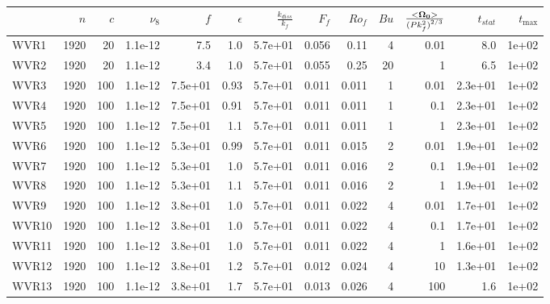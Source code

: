 \documentclass[a4paper]{article}
\begin{document}
\begin{tabular}{lrrrrrrrrrrrr}
\toprule
{} &   $n$ &  $c$ &  $\nu_8$ &     $f$ &  $\epsilon$ &  $\frac{k_{diss}}{k_f}$ &  $F_f$ &  $Ro_f$ &  $Bu$ &  $\frac{<\bf \Omega_0 >}{{(P k_f^2)}^{2/3}}$ &  $t_{stat}$ &  $t_{\max}$ \\
\midrule
WVR1  &  1920 &   20 &  1.1e-12 &     7.5 &         1.0 &                 5.7e+01 &  0.056 &    0.11 &     4 &                                         0.01 &         8.0 &       1e+02 \\
WVR2  &  1920 &   20 &  1.1e-12 &     3.4 &         1.0 &                 5.7e+01 &  0.055 &    0.25 &    20 &                                            1 &         6.5 &       1e+02 \\
WVR3  &  1920 &  100 &  1.1e-12 & 7.5e+01 &        0.93 &                 5.7e+01 &  0.011 &   0.011 &     1 &                                         0.01 &     2.3e+01 &       1e+02 \\
WVR4  &  1920 &  100 &  1.1e-12 & 7.5e+01 &        0.91 &                 5.7e+01 &  0.011 &   0.011 &     1 &                                          0.1 &     2.3e+01 &       1e+02 \\
WVR5  &  1920 &  100 &  1.1e-12 & 7.5e+01 &         1.1 &                 5.7e+01 &  0.011 &   0.011 &     1 &                                            1 &     2.3e+01 &       1e+02 \\
WVR6  &  1920 &  100 &  1.1e-12 & 5.3e+01 &        0.99 &                 5.7e+01 &  0.011 &   0.015 &     2 &                                         0.01 &     1.9e+01 &       1e+02 \\
WVR7  &  1920 &  100 &  1.1e-12 & 5.3e+01 &         1.0 &                 5.7e+01 &  0.011 &   0.016 &     2 &                                          0.1 &     1.9e+01 &       1e+02 \\
WVR8  &  1920 &  100 &  1.1e-12 & 5.3e+01 &         1.1 &                 5.7e+01 &  0.011 &   0.016 &     2 &                                            1 &     1.9e+01 &       1e+02 \\
WVR9  &  1920 &  100 &  1.1e-12 & 3.8e+01 &         1.0 &                 5.7e+01 &  0.011 &   0.022 &     4 &                                         0.01 &     1.7e+01 &       1e+02 \\
WVR10 &  1920 &  100 &  1.1e-12 & 3.8e+01 &         1.0 &                 5.7e+01 &  0.011 &   0.022 &     4 &                                          0.1 &     1.7e+01 &       1e+02 \\
WVR11 &  1920 &  100 &  1.1e-12 & 3.8e+01 &         1.0 &                 5.7e+01 &  0.011 &   0.022 &     4 &                                            1 &     1.6e+01 &       1e+02 \\
WVR12 &  1920 &  100 &  1.1e-12 & 3.8e+01 &         1.2 &                 5.7e+01 &  0.012 &   0.024 &     4 &                                           10 &     1.3e+01 &       1e+02 \\
WVR13 &  1920 &  100 &  1.1e-12 & 3.8e+01 &         1.7 &                 5.7e+01 &  0.013 &   0.026 &     4 &                                          100 &         1.6 &       1e+02 \\
\bottomrule
\end{tabular}
\end{document}
